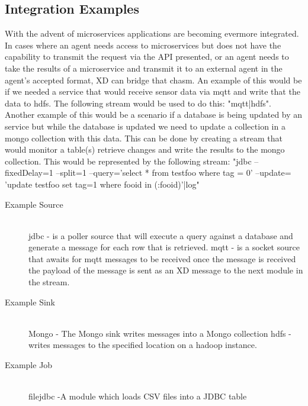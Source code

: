 \subsection{Integration Examples}
With the advent of microservices \cite{microservices-pattern} applications are becoming 
evermore integrated.  In cases where an agent needs access to microservices but does not 
have the capability to transmit the request via the API presented, or an agent needs to 
take the results of a microservice and transmit it to  an external agent in the agent's 
accepted format, XD can bridge that chasm. 
An example of this would be if we needed a service that would receive sensor data via mqtt 
and write that the data to hdfs. The following stream would be used to do this: "mqtt|hdfs".
Another example of this would be a scenario if a database is being updated by an service 
but while the database is updated we need to update a collection in a mongo collection 
with this data.  This can be done by creating a stream that would monitor a table(s) 
retrieve changes and write the results to the mongo collection.  This would be 
represented by the following stream: 
"jdbc --fixedDelay=1 --split=1 --query='select * from testfoo where tag = 0' --update=
'update testfoo set tag=1 where fooid in (:fooid)'|log" 
\begin{description}
\item[Example Source] \hfill \\
jdbc - is a poller source that will execute a query against a database and generate a 
message for each row that is retrieved.  \cite{jdbc-module}
mqtt - is a socket source that awaits for mqtt messages to be received once the message is
 received the payload of the message is sent as an XD message to the next module in the 
 stream.  \cite{mqtt-module}
\item[Example Sink] \hfill \\
Mongo - The Mongo sink writes messages into a Mongo collection \cite{mongo-module}
hdfs - writes messages to the specified location on a hadoop instance. \cite{hadoop-hdfs-module}
\item[Example Job] \hfill \\
filejdbc -A module which loads CSV files into a JDBC table\par
\end{description}
